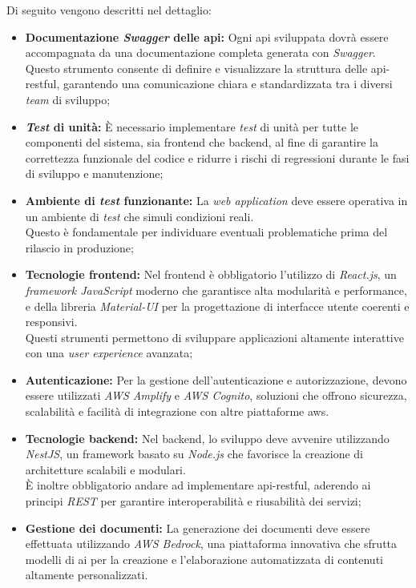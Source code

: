 \noindent Di seguito vengono descritti nel dettaglio:
\begin{itemize}
    \item \textbf{Documentazione \textit{Swagger} delle \gls{api}:} Ogni \gls{api} sviluppata dovrà essere accompagnata da una documentazione completa generata con \textit{Swagger}. \\
    Questo strumento consente di definire e visualizzare la struttura delle \gls{api-restful}, garantendo una comunicazione chiara e standardizzata tra i diversi \textit{team} di sviluppo;
    \item \textbf{\textit{Test} di unità:} È necessario implementare \textit{test} di unità per tutte le componenti del sistema, sia \gls{frontend} che \gls{backend},
    al fine di garantire la correttezza funzionale del codice e ridurre i rischi di regressioni durante le fasi di sviluppo e manutenzione;
    \item \textbf{Ambiente di \textit{test} funzionante:} La \textit{web application} deve essere operativa in un ambiente di \textit{test} che simuli condizioni reali. \\
    Questo è fondamentale per individuare eventuali problematiche prima del rilascio in produzione;
    \item \textbf{Tecnologie \gls{frontend}:} Nel \gls{frontend} è obbligatorio l’utilizzo di \textit{React.js}, un \textit{framework JavaScript} moderno che garantisce alta modularità e performance, e della libreria \textit{Material-UI} per la progettazione di interfacce utente coerenti e responsivi. \\
    Questi strumenti permettono di sviluppare applicazioni altamente interattive con una \textit{user experience} avanzata;
    \item \textbf{Autenticazione:} Per la gestione dell’autenticazione e autorizzazione, devono essere utilizzati \textit{AWS Amplify} e \textit{AWS Cognito}, soluzioni che offrono sicurezza, scalabilità e facilità di integrazione con altre piattaforme \gls{aws}.
    \item \textbf{Tecnologie \gls{backend}:} Nel \gls{backend}, lo sviluppo deve avvenire utilizzando \textit{NestJS}, un framework basato su \textit{Node.js} che favorisce la creazione di architetture scalabili e modulari. \\
    È inoltre obbligatorio andare ad implementare \gls{api-restful}, aderendo ai principi \textit{REST} per garantire interoperabilità e riusabilità dei servizi;
    \item \textbf{Gestione dei documenti:} La generazione dei documenti deve essere effettuata utilizzando \textit{AWS Bedrock}, una piattaforma innovativa che sfrutta modelli di \gls{ai} per la creazione e l’elaborazione automatizzata di contenuti altamente personalizzati. \\

\end{itemize}
